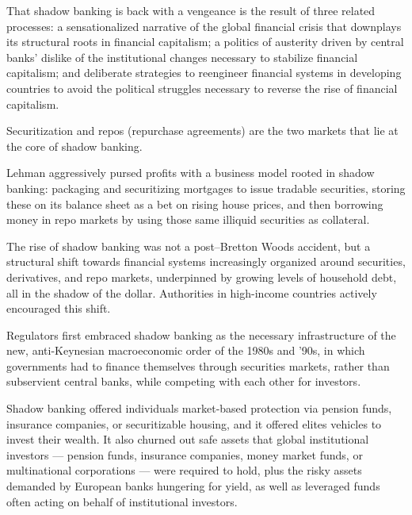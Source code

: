 \documentclass[
]{book}
\begin{document}
That shadow banking is back with a vengeance is the result of three related processes: a sensationalized narrative of the global financial crisis that downplays its structural roots in financial capitalism; a politics of austerity driven by central banks' dislike of the institutional changes necessary to stabilize financial capitalism; and deliberate strategies to reengineer financial systems in developing countries to avoid the political struggles necessary to reverse the rise of financial capitalism.

Securitization and repos (repurchase agreements) are the two markets that lie at the core of shadow banking.

Lehman aggressively pursed profits with a business model rooted in shadow banking: packaging and securitizing mortgages to issue tradable securities, storing these on its balance sheet as a bet on rising house prices, and then borrowing money in repo markets by using those same illiquid securities as collateral.

The rise of shadow banking was not a post--Bretton Woods accident, but a structural shift towards financial systems increasingly organized around securities, derivatives, and repo markets, underpinned by growing levels of household debt, all in the shadow of the dollar. Authorities in high-income countries actively encouraged this shift.

Regulators first embraced shadow banking as the necessary infrastructure of the new, anti-Keynesian macroeconomic order of the 1980s and '90s, in which governments had to finance themselves through securities markets, rather than subservient central banks, while competing with each other for investors.

Shadow banking offered individuals market-based protection via pension funds, insurance companies, or securitizable housing, and it offered elites vehicles to invest their wealth. It also churned out safe assets that global institutional investors --- pension funds, insurance companies, money market funds, or multinational corporations --- were required to hold, plus the risky assets demanded by European banks hungering for yield, as well as leveraged funds often acting on behalf of institutional investors.
\end{document}
